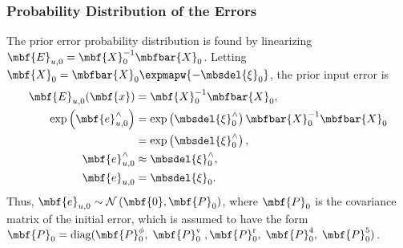 \subsubsection{Probability Distribution of the Errors}

The prior error probability distribution is found by linearizing $\mbf{E}_{u,0} = \mbf{X}_0^{-1}\mbfbar{X}_0$. Letting $\mbf{X}_0 = \mbfbar{X}_0\expmapw{-\mbsdel{\xi}_0}$, the prior input error is
\begin{align*}
	\mbf{E}_{u,0}(\mbf{x}) &= \mbf{X}_0^{-1}\mbfbar{X}_0, \\
	\exp\left(\mbf{e}_{u,0}^\wedge\right) &= \exp\left(\mbsdel{\xi}_0^\wedge\right)\mbfbar{X}_0^{-1}\mbfbar{X}_0 \\
	&= \exp\left(\mbsdel{\xi}_0^\wedge\right), \\
	\mbf{e}_{u,0}^\wedge &\approx \mbsdel{\xi}_0^\wedge, \\
	\mbf{e}_{u,0} &= \mbsdel{\xi}_0.
\end{align*}
Thus, $\mbf{e}_{u,0} \sim \mathcal{N}\left(\mbf{0},\mbf{P}_0\right)$, where $\mbf{P}_0$ is the covariance matrix of the initial error, which is assumed to have the form $\mbf{P}_0 = \textrm{diag}(\mbf{P}_0^\phi,\; \mbf{P}_0^\mathrm{v} \; ,  \mbf{P}_0^\mathrm{r}, \; \mbf{P}_0^4, \; \mbf{P}_0^5)$.


